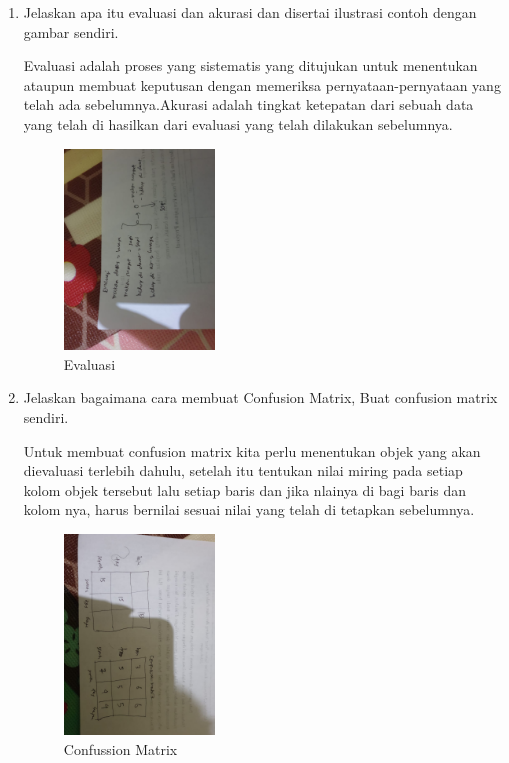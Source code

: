 \begin{enumerate}
            \item Jelaskan apa itu evaluasi dan akurasi dan disertai ilustrasi contoh dengan gambar sendiri.\par
            Evaluasi adalah proses yang sistematis yang ditujukan untuk menentukan ataupun membuat keputusan dengan memeriksa pernyataan-pernyataan yang telah ada sebelumnya.Akurasi adalah tingkat ketepatan dari sebuah data yang telah di hasilkan dari evaluasi yang telah dilakukan sebelumnya.
            \begin{figure}[H]
                \includegraphics[width=4cm]{figures/1174040/chapter2/evaluasi.jpeg}
                \centering
                \caption{Evaluasi}
            \end{figure}

            \item Jelaskan bagaimana cara membuat Confusion Matrix, Buat confusion matrix sendiri.\par
            Untuk membuat confusion matrix kita perlu menentukan objek yang akan dievaluasi terlebih dahulu, setelah itu tentukan nilai miring pada setiap kolom objek tersebut lalu setiap baris dan jika nlainya di bagi baris dan kolom nya, harus bernilai sesuai nilai yang telah di tetapkan sebelumnya.
            \begin{figure}[H]
                \includegraphics[width=4cm]{figures/1174040/chapter2/confused.jpeg}
                \centering
                \caption{Confussion Matrix}
            \end{figure}


\end{enumerate}
